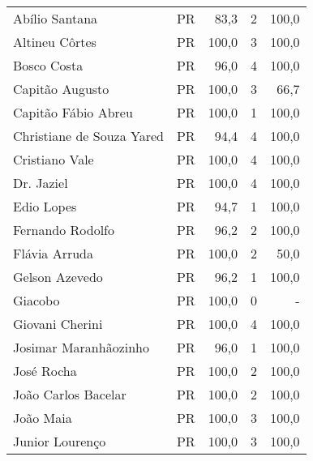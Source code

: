 \begin{longtable}{llrrr}
                      Abílio Santana &             PR &      83,3 &            2 &      100,0 \\
                      Altineu Côrtes &             PR &     100,0 &            3 &      100,0 \\
                         Bosco Costa &             PR &      96,0 &            4 &      100,0 \\
                     Capitão Augusto &             PR &     100,0 &            3 &       66,7 \\
                 Capitão Fábio Abreu &             PR &     100,0 &            1 &      100,0 \\
           Christiane de Souza Yared &             PR &      94,4 &            4 &      100,0 \\
                      Cristiano Vale &             PR &     100,0 &            4 &      100,0 \\
                          Dr. Jaziel &             PR &     100,0 &            4 &      100,0 \\
                          Edio Lopes &             PR &      94,7 &            1 &      100,0 \\
                    Fernando Rodolfo &             PR &      96,2 &            2 &      100,0 \\
                       Flávia Arruda &             PR &     100,0 &            2 &       50,0 \\
                      Gelson Azevedo &             PR &      96,2 &            1 &      100,0 \\
                             Giacobo &             PR &     100,0 &            0 &          - \\
                     Giovani Cherini &             PR &     100,0 &            4 &      100,0 \\
               Josimar Maranhãozinho &             PR &      96,0 &            1 &      100,0 \\
                          José Rocha &             PR &     100,0 &            2 &      100,0 \\
                 João Carlos Bacelar &             PR &     100,0 &            2 &      100,0 \\
                           João Maia &             PR &     100,0 &            3 &      100,0 \\
                     Junior Lourenço &             PR &     100,0 &            3 &      100,0 \\

\end{longtable}

